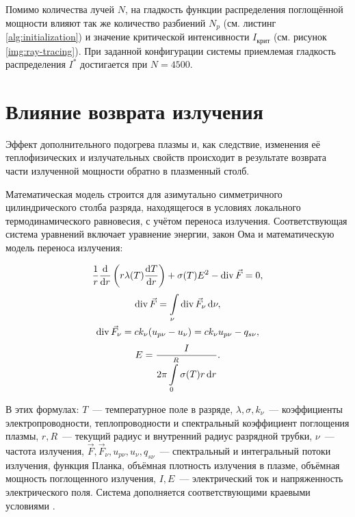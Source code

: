 Помимо количества лучей $N$, на гладкость функции распределения поглощённой мощности влияют так же количество разбиений $N_p$ (см. листинг \ref{alg:initialization}) и значение критической интенсивности $I_{\text{крит}}$ (см. рисунок \ref{img:ray-tracing}).
При заданной конфигурации системы приемлемая гладкость распределения $I^*$ достигается при $N = 4500$.

\pagebreak

\section{Влияние возврата излучения}

Эффект дополнительного подогрева плазмы и, как следствие, изменения её теплофизических и излучательных свойств происходит в результате возврата части излученной мощности обратно в плазменный столб.

Математическая модель строится для азимутально симметричного цилиндрического столба разряда, находящегося в условиях локального термодинамического равновесия, с учётом переноса излучения.
Соответствующая система уравнений включает уравнение энергии, закон Ома и математическую модель переноса излучения:

\begin{equation}
	\label{eqn:article-1}
	\frac1r\frac{\mathrm d}{\mathrm dr} \left( r \lambda(T) \frac{\mathrm dT}{\mathrm dr} \right) + \sigma(T)E^2 - \operatorname{div}{\vec F = 0},
\end{equation}
\begin{equation}
	\label{eqn:article-2}
	\begin{gathered}
		\operatorname{div}{\vec F} = \int\displaylimits_\nu \operatorname{div}{\vec F_\nu} \,\mathrm d\nu, \\
		\operatorname{div}{\vec F_\nu} = ck_{\nu}(u_{p\nu} - u_{\nu}) = ck_{\nu}u_{p\nu} - q_{s\nu}, \\
	\end{gathered}
\end{equation}
\begin{equation}
	\label{eqn:article-3}
	E = \frac{I}{\displaystyle 2\pi\int\displaylimits_0^R \sigma(T) r\,\mathrm dr}.
\end{equation}

В этих формулах: $T$~— температурное поле в разряде, $\lambda, \sigma, k_\nu$~— коэффициенты электропроводности, теплопроводности и спектральный коэффициент поглощения плазмы, $r, R$~— текущий радиус и внутренний радиус разрядной трубки, $\nu$~— частота излучения, $\vec F, \vec F_\nu, u_{p\nu}, u_{\nu}, q_{s\nu}$~— спектральный и интегральный потоки излучения, функция Планка, объёмная плотность излучения в плазме, объёмная мощность поглощенного излучения, $I, E$~— электрический ток и напряженность электрического поля.
Система дополняется соответствующими краевыми условиями \cite{gradov-dissertation}.

